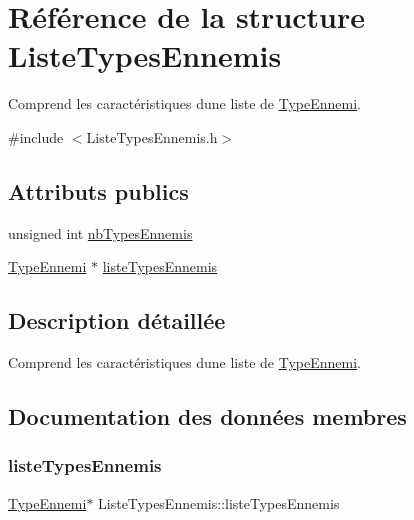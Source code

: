 \hypertarget{structListeTypesEnnemis}{}\section{Référence de la structure Liste\+Types\+Ennemis}
\label{structListeTypesEnnemis}


Comprend les caractéristiques d\textquotesingle{}une liste de \mbox{\hyperlink{structTypeEnnemi}{Type\+Ennemi}}.  




{\ttfamily \#include $<$Liste\+Types\+Ennemis.\+h$>$}

\subsection*{Attributs publics}
\begin{DoxyCompactItemize}
\item 
unsigned int \mbox{\hyperlink{structListeTypesEnnemis_ae489d7d7e8b16a9e7425729fa26b6cbb}{nb\+Types\+Ennemis}}
\item 
\mbox{\hyperlink{structTypeEnnemi}{Type\+Ennemi}} $\ast$ \mbox{\hyperlink{structListeTypesEnnemis_ad79ff1e1da432867073cc1ab7374dfb5}{liste\+Types\+Ennemis}}
\end{DoxyCompactItemize}


\subsection{Description détaillée}
Comprend les caractéristiques d\textquotesingle{}une liste de \mbox{\hyperlink{structTypeEnnemi}{Type\+Ennemi}}. 

\subsection{Documentation des données membres}
\mbox{\label{structListeTypesEnnemis_ad79ff1e1da432867073cc1ab7374dfb5}} 
\subsubsection{\texorpdfstring{liste\+Types\+Ennemis}{listeTypesEnnemis}}
{\footnotesize\ttfamily \mbox{\hyperlink{structTypeEnnemi}{Type\+Ennemi}}$\ast$ Liste\+Types\+Ennemis\+::liste\+Types\+Ennemis}

